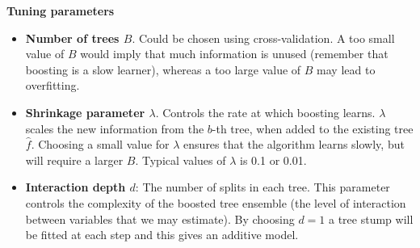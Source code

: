\documentclass[
  10pt,
  ignorenonframetext,
]{beamer}
\begin{document}
\begin{frame}
\textbf{Tuning parameters}

\begin{itemize}
\item
  \textbf{Number of trees \(B\)}. Could be chosen using
  cross-validation. A too small value of \(B\) would imply that much
  information is unused (remember that boosting is a slow learner),
  whereas a too large value of \(B\) may lead to overfitting.
\item
  \textbf{Shrinkage parameter \(\lambda\)}. Controls the rate at which
  boosting learns. \(\lambda\) scales the new information from the
  \(b\)-th tree, when added to the existing tree \(\hat{f}\). Choosing a
  small value for \(\lambda\) ensures that the algorithm learns slowly,
  but will require a larger \(B\). Typical values of \(\lambda\) is 0.1
  or 0.01.
\item
  \textbf{Interaction depth \(d\)}: The number of splits in each tree.
  This parameter controls the complexity of the boosted tree ensemble
  (the level of interaction between variables that we may estimate). By
  choosing \(d=1\) a tree stump will be fitted at each step and this
  gives an additive model.
\end{itemize}
\end{frame}
\end{document}
